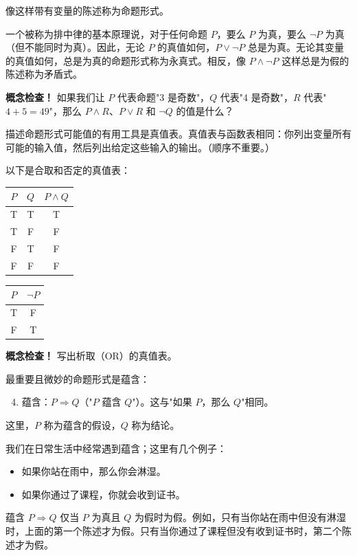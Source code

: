 \documentclass[11pt]{article}
\begin{document}
像这样带有变量的陈述称为命题形式。

一个被称为排中律的基本原理说，对于任何命题 $P$，要么 $P$ 为真，要么 $\neg P$ 为真（但不能同时为真）。因此，无论 $P$ 的真值如何，$P \lor \neg P$ 总是为真。无论其变量的真值如何，总是为真的命题形式称为永真式。相反，像 $P \land \neg P$ 这样总是为假的陈述称为矛盾式。

\textbf{概念检查！} 如果我们让 $P$ 代表命题"3 是奇数"，$Q$ 代表"4 是奇数"，$R$ 代表"$4 + 5 = 49$"，那么 $P \land R$、$P \lor R$ 和 $\neg Q$ 的值是什么？

描述命题形式可能值的有用工具是真值表。真值表与函数表相同：你列出变量所有可能的输入值，然后列出给定这些输入的输出。（顺序不重要。）

以下是合取和否定的真值表：

\begin{center}
\begin{tabular}{cc|c}
$P$ & $Q$ & $P \land Q$ \\
\hline
T & T & T \\
T & F & F \\
F & T & F \\
F & F & F
\end{tabular}
\hspace{2em}
\begin{tabular}{c|c}
$P$ & $\neg P$ \\
\hline
T & F \\
F & T
\end{tabular}
\end{center}

\textbf{概念检查！} 写出析取（OR）的真值表。

最重要且微妙的命题形式是蕴含：

\begin{enumerate}
\setcounter{enumi}{3}
\item 蕴含：$P \Rightarrow Q$（"$P$ 蕴含 $Q$"）。这与"如果 $P$，那么 $Q$"相同。
\end{enumerate}

这里，$P$ 称为蕴含的假设，$Q$ 称为结论。

我们在日常生活中经常遇到蕴含；这里有几个例子：

\begin{itemize}
\item 如果你站在雨中，那么你会淋湿。
\item 如果你通过了课程，你就会收到证书。
\end{itemize}

蕴含 $P \Rightarrow Q$ 仅当 $P$ 为真且 $Q$ 为假时为假。例如，只有当你站在雨中但没有淋湿时，上面的第一个陈述才为假。只有当你通过了课程但没有收到证书时，第二个陈述才为假。
\end{document}
